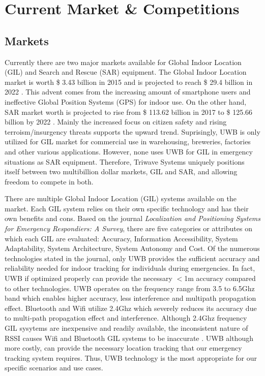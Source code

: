 

\setcounter{section}{2}
\section{Current Market \& Competitions}

\subsection{Markets}
Currently there are two major markets available for Global Indoor Location (\Gls{GIL}) and Search and Rescue (\Gls{SAR}) equipment. 
The Global Indoor Location market is worth \$ 3.43 billion in 2015 and is projected to reach \$ 29.4 billion in 2022 \cite{R3-1}. This advent 
comes from the increasing amount of smartphone users and ineffective Global Position Systems (\Gls{GPS}) for indoor use. On the other hand, SAR market 
worth is projected to rise from \$ 113.62 billion in 2017 to \$ 125.66 billion by 2022 \cite{R3-2}. Mainly the increased focus on citizen 
safety and rising terroism/insurgency threats supports the upward trend. Suprisingly, UWB is only utilized for GIL market for commercial use in 
warehousing, breweries, factories and other various applications. However, none uses UWB for GIL in emergency situations as SAR equipment. 
Therefore, Triwave Systems uniquely positions itself between two multibillion dollar markets, GIL and SAR, and allowing freedom to compete in both. 

\bigskip

There are multiple Global Indoor Location (GIL) systems available on the market. Each GIL system relies on their own specific technology and has 
their own benefits and cons. Based on the journal \textit{Localization and Positioning Systems for Emergency Respondiers: A Survey}\cite{R3-3}, 
there are five categories or attributes on which each GIL are evaluated: Accuracy, Information Accessibility, System Adaptability, System 
Architecture, System Autonomy and Cost. Of the numerous technologies stated in the journal, only UWB provides the sufficient accuracy and 
reliability needed for indoor tracking for individuals during emergencies. In fact, UWB if optimized properly can provide the necessary $<$1m 
accuracy compared to other technologies. UWB operates on the frequency range from 3.5 to 6.5Ghz band which enables higher accuracy, less interference 
and multipath propagation effect. Bluetooth and Wifi utilize 2.4Ghz which severely reduces its accuracy due to multi-path propagation effect 
and interference. Although 2.4Ghz frequency GIL sysytems are inexpensive and readily available, the inconsistent nature of RSSI causes Wifi and 
Bluetooth GIL systems to be inaccurate \cite{R3-4}. UWB although more costly, can provide the necessary location tracking that our emergency 
tracking system requires. Thus, UWB technology is the most appropriate for our specific scenarios and use cases.

